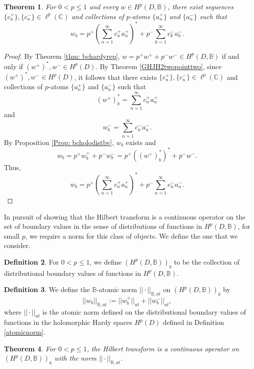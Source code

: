 \documentclass[suppldata]{interact}
\theoremstyle{plain}%
\newtheorem{theorem}{Theorem}[section]
\theoremstyle{definition}
\newtheorem{deff}[theorem]{Definition}
\theoremstyle{remark}
\newcommand{\C}{\mathbb C}
\newcommand{\bc}{\mathbb{B}}
\newcommand{\hpb}{H^p(D,\bc)}
\begin{document}
\begin{theorem}\label{Thm: bcholoatomicdecomp}
    For $0 < p \leq 1$ and every $w \in \hpb$, there exist sequences $\{c_n^+\}, \{c_n^-\} \in \ell^p(\C)$ and collections of $p$-atoms $\{a_n^+\}$ and $\{a_n^-\}$ such that 
    \[
        w_b = p^+ \left( \sum_{n=1}^\infty c^+_n a^+_n\right)^* + p^- \sum_{k=1}^\infty c^-_k a^-_k.
    \]
\end{theorem}

\begin{proof}
By Theorem \ref{thm: bchardyrep}, $w = p^+w^+ +p^- w^- \in \hpb$ if and only if $(w^+)^*, w^- \in H^p(D)$. By Theorem \ref{GHJH2twopointtwo}, since $(w^+)^*,w^- \in H^p(D)$, it follows that there exists $\{c_n^+\}, \{c_n^-\} \in \ell^p(\C)$ and collections of $p$-atoms $\{a_n^+\}$ and $\{a_n^-\}$
such that 
\[
    (w^+)^*_b = \sum_{n=1}^\infty c_n^+ a_n^+
\]
and 
\[
    w^-_b = \sum_{n=1}^\infty c_n^- a_n^-.
\]
By Proposition \ref{Prop: bcholodistbv}, $w_b$ exists and 
\[
    w_b = p^+ w^+_b + p^- w^-_b = p^+((w^+)^*_b)^* + p^- w^-.
\]
Thus, 
\[
    w_b = p^+ \left( \sum_{n=1}^\infty c_n^+a_n^+ \right)^* + p^- \sum_{n=1}^\infty c_n^-a_n^-.
\]

\end{proof}

In pursuit of showing that the Hilbert transform is a continuous operator on the set of boundary values in the sense of distributions of functions in $\hpb$, for small $p$, we require a norm for this class of objects. We define the one that we consider. 

\begin{deff}
    For $0 < p \leq 1$, we define $(\hpb)_b$ to be the collection of distributional boundary values of functions in $\hpb$. 
\end{deff}

\begin{deff}\label{bcatomicnorm}
    We define the $\bc$-atomic norm $||\cdot||_{\bc,at}$ on $(\hpb)_b$ by 
    \[
        ||w_b||_{\bc,at} := ||w^+_b||_{at} + ||w^-_b||_{at},
    \]
    where $||\cdot||_{at}$ is the atomic norm defined on the distributional boundary values of functions in the holomorphic Hardy spaces $H^p(D)$ defined in Definition \ref{atomicnorm}.
\end{deff}

\begin{theorem}\label{bcholohilbertcont}
    For $0 < p \leq 1$, the Hilbert transform is a continuous operator on $(\hpb)_b$ with the norm $||\cdot||_{\bc,at}$. 
\end{theorem}
\end{document}
